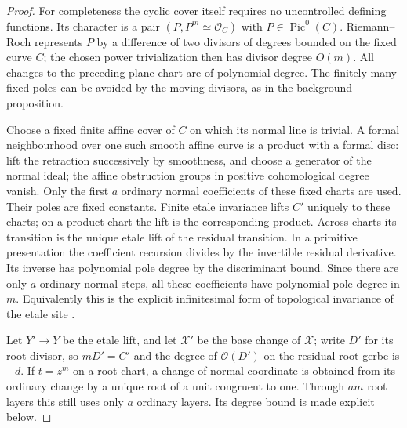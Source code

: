 \begin{proof}
For completeness the cyclic cover itself requires no
uncontrolled defining functions. Its character is a pair
$(P,P^m\simeq\mathcal O_C)$ with $P\in\operatorname{Pic}^0(C)$.
Riemann--Roch represents $P$ by a difference of two divisors
of degrees bounded on the fixed curve $C$; the chosen
power trivialization then has divisor degree $O(m)$.
All changes to the preceding plane chart are of polynomial
degree. The finitely many fixed poles can be avoided by
the moving divisors, as in the background proposition.

Choose a fixed finite affine cover of $C$ on which its
normal line is trivial. A formal neighbourhood over one
such smooth affine curve is a product with a formal disc:
lift the retraction successively by smoothness, and choose
a generator of the normal ideal; the affine obstruction
groups in positive cohomological degree vanish.
Only the first $a$ ordinary normal coefficients of these
fixed charts are used. Their poles are fixed constants.
Finite etale invariance lifts $C'$ uniquely to these charts;
on a product chart the lift is the corresponding product.
Across charts its transition is the unique etale lift of
the residual transition. In a primitive presentation the
coefficient recursion divides by the invertible residual
derivative. Its inverse has polynomial pole degree by
the discriminant bound. Since there are only $a$ ordinary
normal steps, all these coefficients have polynomial pole
degree in $m$. Equivalently this is the explicit infinitesimal
form of topological invariance of the etale site
\citep[Theorems 59.45.1--2 and Proposition 59.45.4]{StacksControlledAnchorsD}.

Let $Y'\to Y$ be the etale lift, and let $\mathcal X'$ be
the base change of $\mathcal X$; write $D'$ for its root
divisor, so $mD'=C'$ and the degree of $\mathcal O(D')$
on the residual root gerbe is $-d$. If $t=z^m$ on a root
chart, a change of normal coordinate is obtained from its
ordinary change by a unique root of a unit congruent to one.
Through $am$ root layers this still uses only $a$ ordinary
layers. Its degree bound is made explicit below.


\end{proof}
